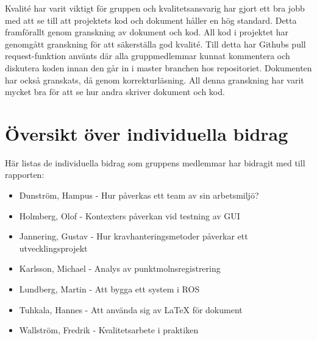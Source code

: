 Kvalité har varit viktigt för gruppen och kvalitetsansvarig har gjort ett bra jobb med att se till att projektets kod och dokument håller en hög standard. Detta framförallt genom granskning av dokument och kod. All kod i projektet har genomgått granskning för att säkerställa god kvalité. Till detta har Githubs pull request-funktion använts där alla gruppmedlemmar kunnat kommentera och diskutera koden innan den går in i master branchen hos repositoriet. Dokumenten har också granskats, då genom korrekturläsning. All denna granskning har varit mycket bra för att se hur andra skriver dokument och kod.  

\section{Översikt över individuella bidrag}

Här listas de individuella bidrag som gruppens medlemmar har bidragit med till rapporten:

\begin{itemize}
	\item Dunström, Hampus - Hur påverkas ett team av sin arbetsmiljö?
	\item Holmberg, Olof - Kontexters påverkan vid testning av GUI
	\item Jannering, Gustav - Hur kravhanteringsmetoder påverkar ett utvecklingsprojekt
	\item Karlsson, Michael - Analys av punktmolnsregistrering
	\item Lundberg, Martin - Att bygga ett system i ROS
	\item Tuhkala, Hannes - Att använda sig av LaTeX för dokument
	\item Wallström, Fredrik - Kvalitetsarbete i praktiken
\end{itemize}

